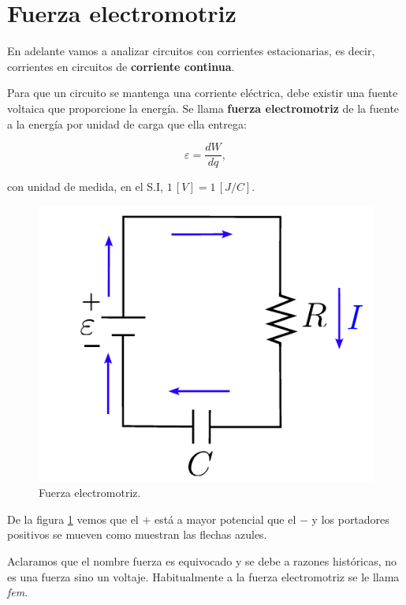 \section{Fuerza electromotriz}

En adelante vamos a analizar circuitos con corrientes estacionarias, es decir, corrientes en circuitos de \textbf{corriente continua}.

Para que un circuito se mantenga una corriente eléctrica, debe existir una fuente voltaica que proporcione la energía. Se llama \textbf{fuerza electromotriz} de la fuente a la energía por unidad de carga que ella entrega:
\begin{shaded}
    $$\varepsilon = \frac{dW}{dq},$$
\end{shaded}

con unidad de medida, en el S.I, $1 \, [V] = 1 \, [J/C]$.

\begin{figure}[H]
    \centering
    \includegraphics[scale = 0.75]{Figuras/fem.pdf}
    \caption{Fuerza electromotriz.}
    \label{fig:fem}
\end{figure}

De la figura \ref{fig:fem} vemos que el $+$ está a mayor potencial que el $-$ y los portadores positivos se mueven como muestran las flechas azules.

Aclaramos que el nombre fuerza es equivocado y se debe a razones históricas, no es una fuerza sino un voltaje. Habitualmente a la fuerza electromotriz se le llama \textit{fem}. 

